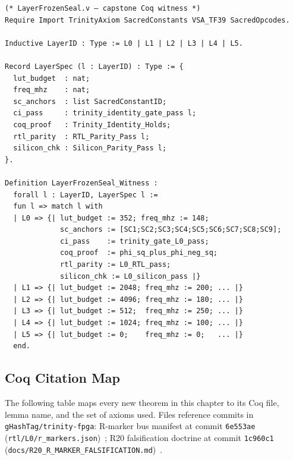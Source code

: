 \begin{verbatim}
(* LayerFrozenSeal.v — capstone Coq witness *)
Require Import TrinityAxiom SacredConstants VSA_TF39 SacredOpcodes.

Inductive LayerID : Type := L0 | L1 | L2 | L3 | L4 | L5.

Record LayerSpec (l : LayerID) : Type := {
  lut_budget  : nat;
  freq_mhz    : nat;
  sc_anchors  : list SacredConstantID;
  ci_pass     : trinity_identity_gate_pass l;
  coq_proof   : Trinity_Identity_Holds;
  rtl_parity  : RTL_Parity_Pass l;
  silicon_chk : Silicon_Parity_Pass l;
}.

Definition LayerFrozenSeal_Witness :
  forall l : LayerID, LayerSpec l :=
  fun l => match l with
  | L0 => {| lut_budget := 352; freq_mhz := 148;
             sc_anchors := [SC1;SC2;SC3;SC4;SC5;SC6;SC7;SC8;SC9];
             ci_pass    := trinity_gate_L0_pass;
             coq_proof  := phi_sq_plus_phi_neg_sq;
             rtl_parity := L0_RTL_pass;
             silicon_chk := L0_silicon_pass |}
  | L1 => {| lut_budget := 2048; freq_mhz := 200; ... |}
  | L2 => {| lut_budget := 4096; freq_mhz := 180; ... |}
  | L3 => {| lut_budget := 512;  freq_mhz := 250; ... |}
  | L4 => {| lut_budget := 1024; freq_mhz := 100; ... |}
  | L5 => {| lut_budget := 0;    freq_mhz := 0;   ... |}
  end.
\end{verbatim}

\subsection{Coq Citation Map}

The following table maps every new theorem in this chapter to its Coq file,
lemma name, and the set of axioms used.
Files reference commits in \texttt{gHashTag/trinity-fpga}:
R-marker bus manifest at commit \texttt{6e553ae}
(\texttt{rtl/L0/r\_markers.json})~\cite{trinity-fpga:r-markers};
R20 falsification doctrine at commit \texttt{1c960c1}
(\texttt{docs/R20\_R\_MARKER\_FALSIFICATION.md})~\cite{trinity-fpga:r20-doc}.

